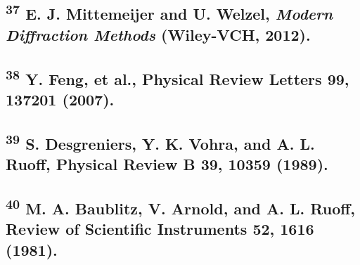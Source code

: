 \subsection{\texorpdfstring{\textsuperscript{37} E. J. Mittemeijer and
U. Welzel, \emph{Modern Diffraction Methods} (Wiley-VCH,
2012).}{37 E. J. Mittemeijer and U. Welzel, Modern Diffraction Methods (Wiley-VCH, 2012).}}\label{e.-j.-mittemeijer-and-u.-welzel-modern-diffraction-methods-wiley-vch-2012.}

\subsection{\texorpdfstring{\textsuperscript{38} Y. Feng, et al.,
Physical Review Letters 99, 137201
(2007).}{38 Y. Feng, et al., Physical Review Letters 99, 137201 (2007).}}\label{y.-feng-et-al.-physical-review-letters-99-137201-2007.}

\subsection{\texorpdfstring{\textsuperscript{39} S. Desgreniers, Y. K.
Vohra, and A. L. Ruoff, Physical Review B 39, 10359
(1989).}{39 S. Desgreniers, Y. K. Vohra, and A. L. Ruoff, Physical Review B 39, 10359 (1989).}}\label{s.-desgreniers-y.-k.-vohra-and-a.-l.-ruoff-physical-review-b-39-10359-1989.}

\subsection{\texorpdfstring{\textsuperscript{40} M. A. Baublitz, V.
Arnold, and A. L. Ruoff, Review of Scientific Instruments 52, 1616
(1981).}{40 M. A. Baublitz, V. Arnold, and A. L. Ruoff, Review of Scientific Instruments 52, 1616 (1981).}}\label{m.-a.-baublitz-v.-arnold-and-a.-l.-ruoff-review-of-scientific-instruments-52-1616-1981.}



